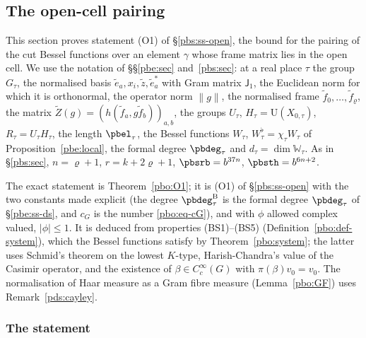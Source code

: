 \documentclass[10pt]{amsart}
\theoremstyle{definition}
\theoremstyle{remark}
\begin{document}
\subsection{The open-cell pairing}\label{pbo:sec}

This section proves statement \textup{(O1)} of \S\ref{pbs:ss-open}, the bound for the pairing of
the cut Bessel functions over an element $\gamma$ whose frame matrix lies in the open cell. We use
the notation of \S\S\ref{pbe:sec} and~\ref{pbs:sec}: at a real place $\tau$ the group $G_\tau$, the
normalised basis $\tilde e_a,x_i,\tilde z,\tilde e^*_a$ with Gram matrix $\mathsf J_1$, the
Euclidean norm for which it is orthonormal, the operator norm $\|g\|$, the normalised frame
$\tilde f_0,\dots,\tilde f_\varrho$, the matrix $\tilde Z(g)=(h(\tilde f_a,g\tilde f_b))_{a,b}$, the
groups $U_\tau$, $H_\tau=\mathrm U(X_{0,\tau})$, $R_\tau=U_\tau H_\tau$, the length $\pbel_\tau$, the
Bessel functions $W_\tau$, $W^\flat_\tau=\chi_\tau W_\tau$ of Proposition~\ref{pbe:local}, the formal
degree $\pbdeg_\tau$ and $d_\tau=\dim\mathbb W_\tau$. As in \S\ref{pbs:sec}, $n=\varrho+1$,
$r=k+2\varrho+1$, $\pbsrb=b^{37n}$, $\pbsth=b^{6n+2}$.

The exact statement is Theorem~\ref{pbo:O1}; it is \textup{(O1)} of \S\ref{pbs:ss-open} with the two
constants made explicit (the degree $\pbdeg^{\mathrm B}_\tau$ is the formal degree $\pbdeg_\tau$ of
\S\ref{pbe:ss-ds}, and $c_G$ is the number \eqref{pbo:eq-cG}), and with $\phi$ allowed complex valued,
$|\phi|\le1$. It is deduced from properties \textup{(BS1)--(BS5)} (Definition~\ref{pbo:def-system}), which
the Bessel functions satisfy by Theorem~\ref{pbo:system}; the latter uses Schmid's theorem on the lowest
$K$-type, Harish-Chandra's value of the Casimir operator, and the existence of $\beta\in C^\infty_c(G)$
with $\pi(\beta)v_0=v_0$. The normalisation of Haar measure as a Gram fibre measure (Lemma~\ref{pbo:GF})
uses Remark~\ref{pds:cayley}.

\subsubsection{The statement}\label{pbo:ss-statement}
\end{document}
